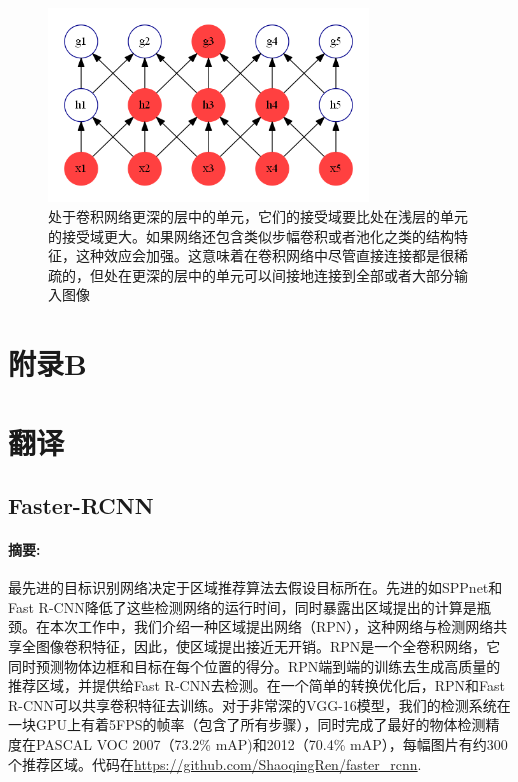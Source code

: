 \documentclass[12pt,a4paper,titlepage]{article}
\begin{document}
\begin{figure}[htbp]

\centering
\includegraphics[width=8.5cm]{img/deep_receptive_field.png}
\caption{处于卷积网络更深的层中的单元，它们的接受域要比处在浅层的单元的接受域更大。如果网络还包含类似步幅卷积或者池化之类的结构特征，这种效应会加强。这意味着在卷积网络中尽管直接连接都是很稀疏的，但处在更深的层中的单元可以间接地连接到全部或者大部分输入图像}
\label{fig:receptive_field}
\end{figure}

\newpage
\section*{附录B}

\section*{翻译}

\subsection*{Faster-RCNN}

\paragraph {摘要:}
最先进的目标识别网络决定于区域推荐算法去假设目标所在。先进的如SPPnet和Fast R-CNN降低了这些检测网络的运行时间，同时暴露出区域提出的计算是瓶颈。在本次工作中，我们介绍一种区域提出网络（RPN），这种网络与检测网络共享全图像卷积特征，因此，使区域提出接近无开销。RPN是一个全卷积网络，它同时预测物体边框和目标在每个位置的得分。RPN端到端的训练去生成高质量的推荐区域，并提供给Fast R-CNN去检测。在一个简单的转换优化后，RPN和Fast R-CNN可以共享卷积特征去训练。对于非常深的VGG-16模型，我们的检测系统在一块GPU上有着5FPS的帧率（包含了所有步骤），同时完成了最好的物体检测精度在PASCAL VOC 2007（73.2\% mAP)和2012（70.4\% mAP），每幅图片有约300个推荐区域。代码在\url{https://github.com/ShaoqingRen/faster_rcnn}.
\end{document}
